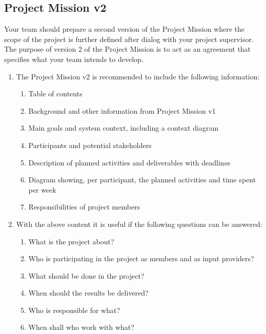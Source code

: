 \documentclass{project}
\begin{document}
\subsection{Project Mission v2}
Your team should prepare a second version of the Project Mission where the scope of the project is further defined after dialog with your project supervisor. The purpose of version 2 of the Project Mission is to act as an agreement that specifies what your team intends to develop.

\begin{enumerate}
  \item The Project Mission v2 is recommended to include the following information:
  \begin{enumerate}
    \item Table of contents
    \item Background and other information from Project Mission v1
    \item Main goals and system context, including a context diagram
    \item Participants and potential stakeholders
    \item Description of planned activities and deliverables with deadlines
    \item Diagram showing, per participant, the planned activities and time spent per week
    \item Responsibilities of project members
  \end{enumerate}
  \item With the above content it is useful if the following questions can be answered:
  \begin{enumerate}
  \item What is the project about?
  \item Who is participating in the project as members and as input providers?
  \item What should be done in the project?
  \item When should the results be delivered?
  \item Who is responsible for what?
  \item When shall who work with what?
\end{enumerate}
\end{enumerate}

\end{document}
